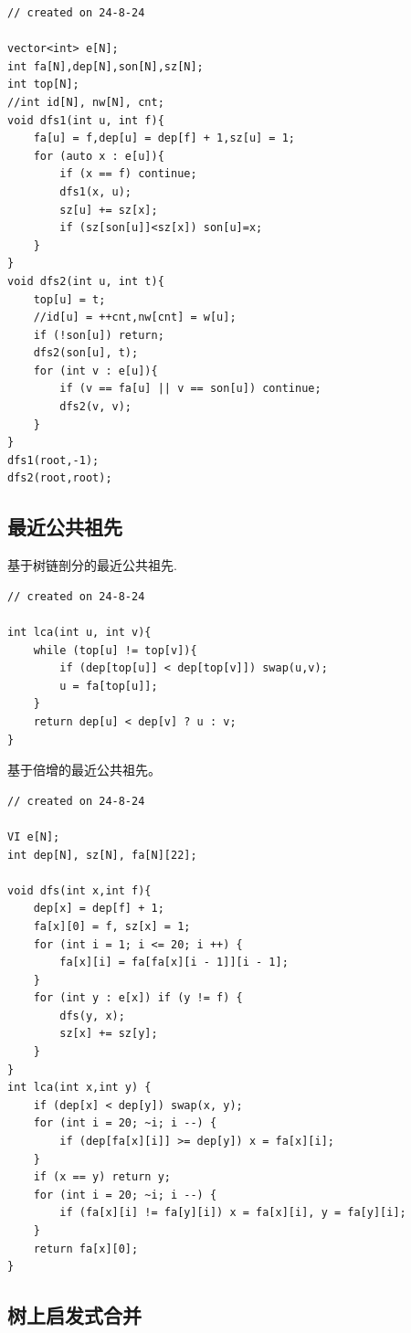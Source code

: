 \documentclass[a4paper,12pt]{article}
\begin{document}
\begin{lstlisting}
// created on 24-8-24

vector<int> e[N];
int fa[N],dep[N],son[N],sz[N];
int top[N];
//int id[N], nw[N], cnt;
void dfs1(int u, int f){
    fa[u] = f,dep[u] = dep[f] + 1,sz[u] = 1;
    for (auto x : e[u]){
        if (x == f) continue;
        dfs1(x, u);
        sz[u] += sz[x];
        if (sz[son[u]]<sz[x]) son[u]=x;
    }
}
void dfs2(int u, int t){
    top[u] = t;
    //id[u] = ++cnt,nw[cnt] = w[u];
    if (!son[u]) return;
    dfs2(son[u], t);
    for (int v : e[u]){
        if (v == fa[u] || v == son[u]) continue;
        dfs2(v, v);
    }
}
dfs1(root,-1);
dfs2(root,root);   
\end{lstlisting}

\subsection{最近公共祖先}

\noindent 基于树链剖分的最近公共祖先.

\begin{lstlisting}
// created on 24-8-24

int lca(int u, int v){
    while (top[u] != top[v]){
        if (dep[top[u]] < dep[top[v]]) swap(u,v);
        u = fa[top[u]];
    }
    return dep[u] < dep[v] ? u : v;
}
\end{lstlisting}

\noindent 基于倍增的最近公共祖先。

\begin{lstlisting}
// created on 24-8-24

VI e[N];
int dep[N], sz[N], fa[N][22];

void dfs(int x,int f){
    dep[x] = dep[f] + 1; 
    fa[x][0] = f, sz[x] = 1;
    for (int i = 1; i <= 20; i ++) {
        fa[x][i] = fa[fa[x][i - 1]][i - 1];
    }
    for (int y : e[x]) if (y != f) {
        dfs(y, x);
        sz[x] += sz[y];
    }
}
int lca(int x,int y) {
    if (dep[x] < dep[y]) swap(x, y);
    for (int i = 20; ~i; i --) {
        if (dep[fa[x][i]] >= dep[y]) x = fa[x][i];
    }
    if (x == y) return y;
    for (int i = 20; ~i; i --) {
        if (fa[x][i] != fa[y][i]) x = fa[x][i], y = fa[y][i];
    }
    return fa[x][0];
}   
\end{lstlisting}

\subsection{树上启发式合并}
\end{document}
